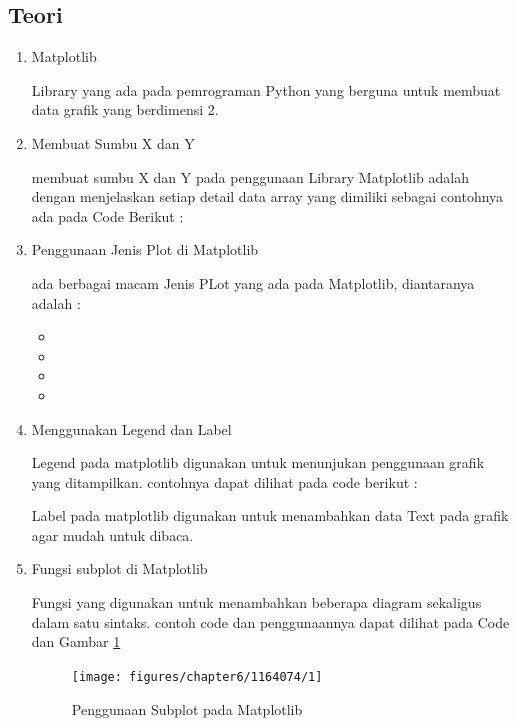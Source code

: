 \subsection{Teori}
\begin{enumerate}
\item Matplotlib
\par Library yang ada pada pemrograman Python yang berguna untuk membuat data grafik yang berdimensi 2.

\item Membuat Sumbu X dan Y
\par membuat sumbu X dan Y pada penggunaan Library Matplotlib adalah dengan menjelaskan setiap detail data array yang dimiliki sebagai contohnya ada pada Code Berikut : 


\item Penggunaan Jenis Plot di Matplotlib
\par ada berbagai macam Jenis PLot yang ada pada Matplotlib, diantaranya adalah :
\begin{itemize}
\item 
\item 
\item 
\item 
\end{itemize}

\item Menggunakan Legend dan Label
\par Legend pada matplotlib digunakan untuk menunjukan penggunaan grafik yang ditampilkan. contohnya dapat dilihat pada code berikut : 


\par Label pada matplotlib digunakan untuk menambahkan data Text pada grafik agar mudah untuk dibaca.


\item Fungsi subplot di Matplotlib
\par Fungsi yang digunakan untuk menambahkan beberapa diagram sekaligus dalam satu sintaks. contoh code dan penggunaannya dapat dilihat pada Code dan Gambar \ref{data1}

\begin{figure} [!htbp]
	\centerline{\texttt{[image: figures/chapter6/1164074/1]}}
	\caption{Penggunaan Subplot pada Matplotlib}
	\label{data1}
\end{figure}


\end{enumerate}

